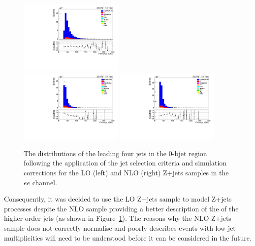 \begin{figure}[!hp]
\includegraphics[width=0.45\textwidth]{figs/background-estimation/plots/unblinded/DY_control_old_prompt_ee_DYamcatnlo/thirdJetPt_SingleTop_jetSel_ee.pdf}
\\
\includegraphics[width=0.45\textwidth]{figs/background-estimation/plots/unblinded/DY_control_old_prompt_ee_ttbarInc/fourthJetPt_SingleTop_jetSel_ee.pdf}
\includegraphics[width=0.45\textwidth]{figs/background-estimation/plots/unblinded/DY_control_old_prompt_ee_DYamcatnlo/fourthJetPt_SingleTop_jetSel_ee.pdf}
\caption{
The distributions of the leading four jets \pt in the 0-bjet region following the application of the jet selection criteria and simulation corrections for the LO (left) and NLO (right) Z+jets samples in the $ee$ channel.
}
\label{fig:zPlusCR_jetPt}
\end{figure}

Consequently, it was decided to use the LO Z+jets sample to model Z+jets processes despite the NLO sample providing a better description of the \pT of the higher order jets (as shown in Figure~\ref{fig:zPlusCR_jetPt}).
The reasons why the NLO Z+jets sample does not correctly normalise and poorly describes events with low jet multiplicities will need to be understood before it can be considered in the future.

